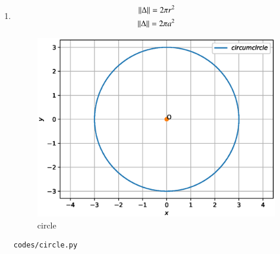 \renewcommand{\theequation}{\theenumi}
\begin{enumerate}[label=\arabic*.,ref=\thesubsection.\theenumi]

\item 
\begin{align}
\left\lVert\Delta\right\rVert = 2\pi r^2
\\
\left\lVert\Delta\right\rVert = 2\pi a^2
\end{align}
\begin{figure}[!ht]
\centering
\includegraphics[width=\columnwidth]{./figures/circle.eps}
\caption{circle }
\label{fig:circle}
\end{figure}
\begin{lstlisting}
codes/circle.py
\end{lstlisting}

\end{enumerate}